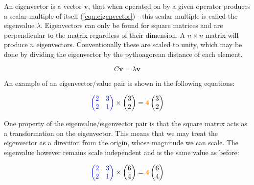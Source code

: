 \begin{appendices}
  An eigenvector is a vector $\textbf{v}$, that when operated on by a given operator produces a scalar multiple of itself (\autoref{eqn:eigenvector}) - this scalar multiple is called the eigenvalue $\lambda$. Eigenvectors can only be found for square matrices and are perpendicular to the matrix regardless of their dimension. A $n \times n$ matrix will produce $n$ eigenvectors. Conventionally these are scaled to unity, which may be done by dividing the eigenvector by the pythoagorean distance of each element.

  \begin{equation}
      C\textbf{v} = \lambda\textbf{v}
      \label{eqn:eigenvector}
  \end{equation}

  An example of an eigenvector/value pair is shown in the following equations:

  \begin{equation}
   \textcolor{blue}{
    \begin{pmatrix}
      2 & 3 \\
      2 & 1
    \end{pmatrix}
    }
    \times
    \begin{pmatrix}
      3 \\ 2
    \end{pmatrix}
    =
     \textcolor{orange}{\textbf{4}}
     \begin{pmatrix}
      3 \\ 2
    \end{pmatrix}
  \end{equation}

  One property of the eigenvalue/eigenvector pair is that the square matrix acts as a transformation on the eigenvector. This means that we may treat the eigenvector as a direction from the origin, whose magnitude we can scale. The eigenvalue however remains scale independent and is the same value as before:

  \begin{equation}
   \textcolor{blue}{
    \begin{pmatrix}
      2 & 3 \\
      2 & 1
    \end{pmatrix}
    }
    \times
    \begin{pmatrix}
      6 \\ 4
    \end{pmatrix}
    =
    \textcolor{orange}{\textbf{4}}
     \begin{pmatrix}
      6 \\ 4
    \end{pmatrix}
  \end{equation}


\end{appendices}
